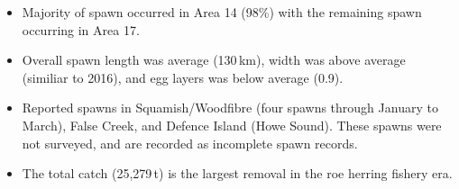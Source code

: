 \begin{itemize}
\item Majority of spawn occurred in Area 14 (98\%) with the remaining spawn occurring in Area 17.
\item Overall spawn length was average (130\,km), width was above average (similiar to 2016), and egg layers was below average (0.9).
\item Reported spawns in Squamish/Woodfibre (four spawns through January to March), False Creek, and Defence Island (Howe Sound).
These spawns were not surveyed, and are recorded as incomplete spawn records.
\item The total catch (25,279\,t) is the largest removal in the roe herring fishery era.
\end{itemize}